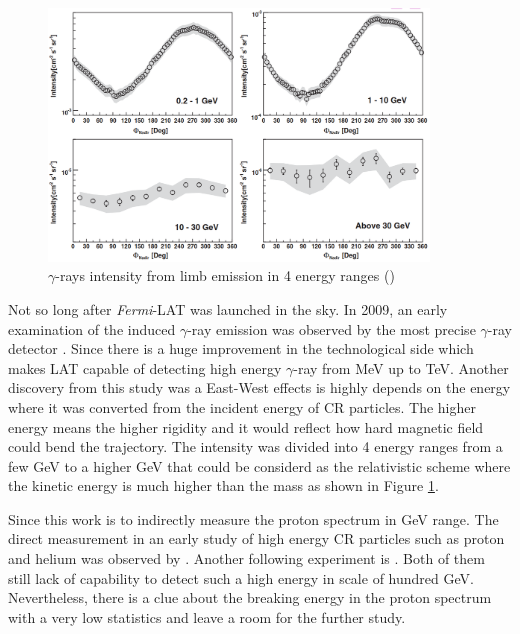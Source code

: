 \begin{figure}[h]
    \centering
    \includegraphics[width=0.9\textwidth]{content/literature_review/figures/fermi_eastwest.png}
    \caption{
        $\gamma$-rays intensity from limb emission in 4 energy ranges
        (\cite{fermilat_gamma_induced})
    }
    \label{fig:fermi_eastwest}
\end{figure}

Not so long after \textit{Fermi}-LAT was launched in the sky. In 2009,
an early examination of the induced $\gamma$-ray emission was 
observed by the most precise $\gamma$-ray detector
\cite{fermilat_gamma_induced}. Since there 
is a huge improvement in the technological side which makes LAT 
capable of detecting high energy $\gamma$-ray from MeV up to TeV.
Another discovery from this study was a East-West effects is highly 
depends on the energy where it was converted from the incident 
energy of CR particles. The higher energy means the higher rigidity
and it would reflect how hard magnetic field could bend the trajectory.
The intensity was divided into 4 energy ranges from a few GeV 
to a higher GeV that could be considerd as the relativistic scheme 
where the kinetic energy is much higher than the mass as shown 
in Figure \ref{fig:fermi_eastwest}.

Since this work is to indirectly measure the proton spectrum in 
GeV range. The direct measurement in an early study of high energy 
CR particles such as proton and helium was observed by \cite{bess_experiment}.
Another following experiment is \cite{adriani2011pamela}. Both of 
them still lack of capability to detect such a high energy in scale of 
hundred GeV. Nevertheless, there is a clue about the breaking energy 
in the proton spectrum with a very low statistics and leave 
a room for the further study.


